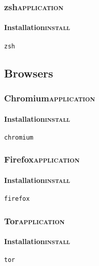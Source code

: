 \documentclass[11pt]{article}
\begin{document}
\subsubsection{zsh\hfill{}\textsc{application}}
\label{sec:orge0adee9}
\paragraph{Installation\hfill{}\textsc{install}}
\label{sec:org894da66}
\begin{verbatim}
zsh
\end{verbatim}

\subsection{Browsers}
\label{sec:org243a10f}
\subsubsection{Chromium\hfill{}\textsc{application}}
\label{sec:org208e0bb}
\paragraph{Installation\hfill{}\textsc{install}}
\label{sec:org5fcc923}
\begin{verbatim}
chromium
\end{verbatim}

\subsubsection{Firefox\hfill{}\textsc{application}}
\label{sec:org9b1180a}
\paragraph{Installation\hfill{}\textsc{install}}
\label{sec:orgb99ec0c}
\begin{verbatim}
firefox
\end{verbatim}

\subsubsection{Tor\hfill{}\textsc{application}}
\label{sec:org410c21b}
\paragraph{Installation\hfill{}\textsc{install}}
\label{sec:org3da64b5}
\begin{verbatim}
tor
\end{verbatim}
\end{document}
